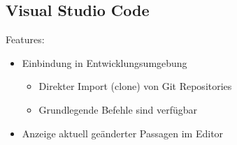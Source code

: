 \subsection{Visual Studio Code}
\begin{frame}
Features:
\begin{itemize}
	\item <2->Einbindung in Entwicklungsumgebung
	\begin{itemize}
		\item <3->Direkter Import (clone) von Git Repositories
		\item <4->Grundlegende Befehle sind verfügbar
	\end{itemize}
	\item <5->Anzeige aktuell geänderter Passagen im Editor
\end{itemize}
\end{frame}